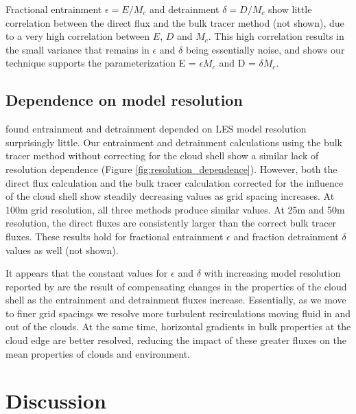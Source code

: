 \documentclass[12pt]{article}
\begin{document}
Fractional entrainment $\epsilon = E/M_c$ and detrainment $\delta = D/M_c$ show 
little correlation between the direct flux and the bulk tracer method (not 
shown), due to a very high correlation between $E$, $D$ and $M_c$.  This high 
correlation results in the small variance that remains in $\epsilon$ and 
$\delta$ being essentially noise, and shows our technique supports the 
parameterization E = $\epsilon M_c$ and D = $\delta M_c$.


\subsection{Dependence on model resolution}

\cite{Brown1999} found entrainment and detrainment depended on LES model 
resolution surprisingly little.  Our entrainment and detrainment calculations 
using the bulk tracer method without correcting for the cloud shell show a
similar lack of resolution dependence (Figure \ref{fig:resolution_dependence}).
However, both the direct flux calculation and the bulk tracer calculation 
corrected for the influence of the cloud shell show steadily decreasing values 
as grid spacing increases.  At 100m grid resolution, all three methods produce
similar values.  At 25m and 50m resolution, the direct fluxes are consistently 
larger than the correct bulk tracer fluxes.  These results hold for fractional
entrainment $\epsilon$ and fraction detrainment $\delta$ values as well (not
shown).  

It appears that the constant values for $\epsilon$ and $\delta$ with increasing
model resolution reported by \cite{Brown1999} are the result of compensating
changes in the properties of the cloud shell as the entrainment and detrainment
fluxes increase.  Essentially, as we move to finer grid spacings we resolve
more turbulent recirculations moving fluid in and out of the clouds.  At the
same time, horizontal gradients in bulk properties at the cloud edge are better
resolved, reducing the impact of these greater fluxes on the mean properties of 
clouds and environment.


\section{Discussion}
\end{document}
